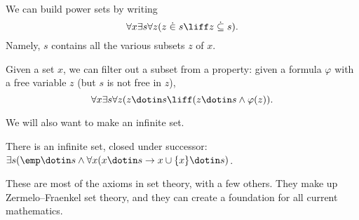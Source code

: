 \documentclass[../notes.tex]{subfiles}
\begin{document}
\begin{axiom}
	We can build power sets by writing
	\[\forall x\exists s\forall z(z\dot{{}\in{}} s\liff z\dot{{}\subseteq{}} s).\]
	Namely, $s$ contains all the various subsets $z$ of $x$.
\end{axiom}
\begin{axiom}[Separation]
	Given a set $x$, we can filter out a subset from a property: given a formula $\varphi$ with a free variable $z$ (but $s$ is not free in $z$),
	\[\forall x\exists s\forall z(z\dotin s\liff(z\dotin s\land\varphi(z)).\]
\end{axiom}
We will also want to make an infinite set.
\begin{axiom}[Infinity]
	There is an infinite set, closed under successor: $\exists s(\emp\dotin s\land\forall x(x\dotin s\to x\cup\{x\}\dotin s)$.
\end{axiom}
These are most of the axioms in set theory, with a few others. They make up Zermelo--Fraenkel set theory, and they can create a foundation for all current mathematics.
\end{document}
